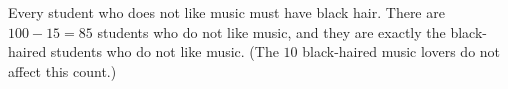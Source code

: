 Every student who does not like music must have black hair. There are $100-15=\boxed{85}$ students who do not like music, and they are exactly the black-haired students who do not like music. (The $10$ black-haired music lovers do not affect this count.)
